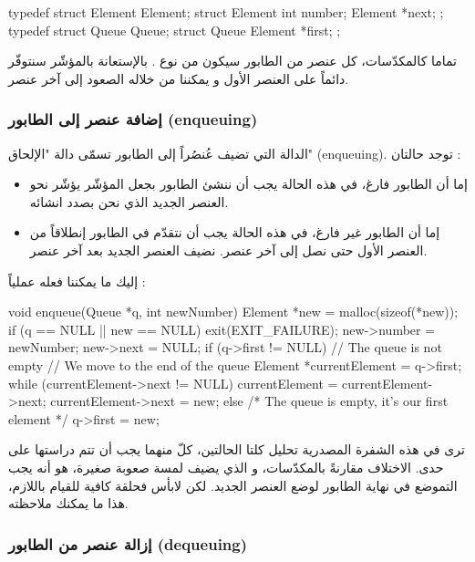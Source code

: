 \begin{Csource}
typedef struct Element Element;
struct Element
{
	int number;
	Element *next;
};
typedef struct Queue Queue;
struct Queue
{
	Element *first;
};
\end{Csource}

تماما كالمكدّسات، كل عنصر من الطابور سيكون من نوع
.
بالإستعانة بالمؤشّر 
سنتوفّر دائماً على العنصر الأول و يمكننا من خلاله الصعود إلى آخر عنصر.

\subsubsection{إضافة عنصر إلى الطابور (\textenglish{enqueuing})}

الدالة التي تضيف عُنصُراً إلى الطابور تسمّى دالة "الإلحاق"
(\textenglish{enqueuing}).
توجد حالتان :

\begin{itemize}
	\item إما أن الطابور فارغ، في هذه الحالة يجب أن ننشئ الطابور بجعل المؤشّر
	يؤشّر نحو العنصر الجديد الذي نحن بصدد انشائه.
	\item إما أن الطابور غير فارغ، في هذه الحالة يجب أن نتقدّم في الطابور إنطلاقاً من العنصر الأول حتى نصل إلى آخر عنصر. نضيف العنصر الجديد بعد آخر عنصر.
\end{itemize}
إليك ما يمكننا فعله عملياً :

\begin{Csource}
void enqueue(Queue *q, int newNumber)
{
	Element *new = malloc(sizeof(*new));
	if (q == NULL || new == NULL)
	{
		exit(EXIT_FAILURE);
	}
	new->number = newNumber;
	new->next = NULL;
	if (q->first != NULL) // The queue is not empty
	{
		// We move to the end of the queue
		Element *currentElement = q->first;
		while (currentElement->next != NULL)
		{
			currentElement = currentElement->next;
		}
		currentElement->next = new;
	}
	else /* The queue is empty, it's our first element */
	{
		q->first = new;
	}
}
\end{Csource}

ترى في هذه الشفرة المصدرية تحليل كلتا الحالتين، كلّ منهما يجب أن تتم دراستها على حدى. الاختلاف مقارنةً بالمكدّسات، و الذي يضيف لمسة صعوبة صغيرة، هو أنه يجب التموضع في نهاية الطابور لوضع العنصر الجديد. لكن لابأس فحلقة
كافية للقيام باللازم، هذا ما يمكنك ملاحظته.

\subsubsection{إزالة عنصر من الطابور (\textenglish{dequeuing})}

